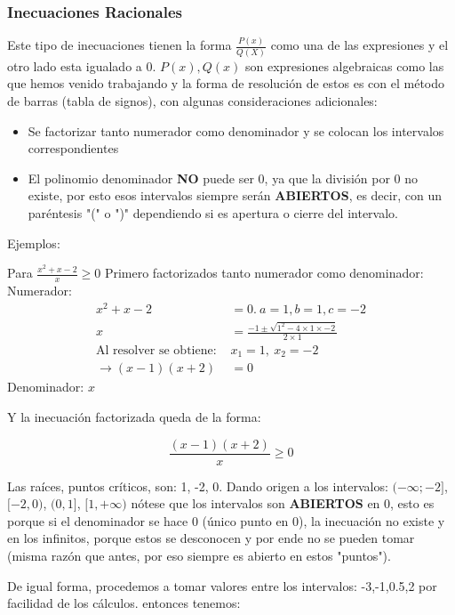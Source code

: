 \subsubsection*{Inecuaciones Racionales}
    Este tipo de inecuaciones tienen la forma $ \displaystyle \frac{P(x)}{Q(X)} $
    como una de las expresiones y el otro lado esta igualado a 0.
    $ P(x), Q(x) $ son expresiones algebraicas como las que hemos venido trabajando
    y la forma de resolución de estos es con el método de barras (tabla de signos),
    con algunas consideraciones adicionales:

    \begin{itemize}
        \item Se factorizar tanto numerador como denominador y se colocan los
            intervalos correspondientes
        \item El polinomio denominador \textbf{NO} puede ser 0, ya que la división
            por 0 no existe, por esto esos intervalos siempre serán \textbf{ABIERTOS},
            es decir, con un paréntesis "(" o ")" dependiendo si  es apertura o
            cierre del intervalo.
    \end{itemize}

    Ejemplos:

    Para $ \frac{x^2+x-2}{x} \geq 0 $
    Primero factorizados tanto numerador como denominador:
    Numerador:
    \begin{align*}
        x^2+x-2 &=0.\ a=1,b=1,c=-2 		\\
        x &= \frac{-1\pm \sqrt{1^2-4\times1\times-2}}{2\times1}\\
        \text{Al resolver se obtiene: }& x_1=1,\ x_2=-2\\
        \rightarrow (x-1)(x+2)&=0
    \end{align*}
    Denominador: $x$

    Y la inecuación factorizada queda de la forma:

    $$ \frac{(x-1)(x+2)}{x} \geq 0  $$

    Las raíces, puntos críticos, son: 1, -2, 0. Dando origen a los intervalos:
    $ (-\infty;-2]$, $[-2,0)$, $ (0,1] $, $[1,+\infty)$
    nótese que los intervalos son \textbf{ABIERTOS} en 0, esto es porque si el
    denominador se hace 0 (único punto en 0), la inecuación no existe y en los
    infinitos, porque estos se desconocen y por ende no se pueden tomar (misma
    razón que antes, por eso siempre es abierto en estos "puntos").

    De igual forma, procedemos a tomar valores entre los intervalos:
    -3,-1,0.5,2 por facilidad de los cálculos. entonces tenemos:

